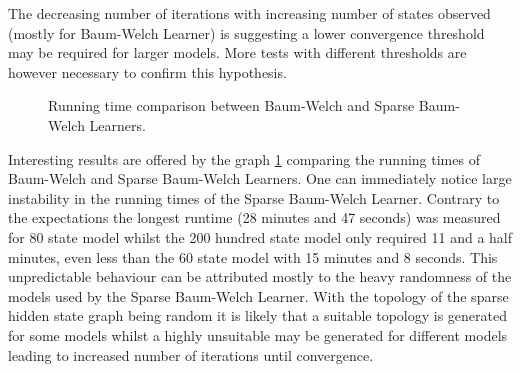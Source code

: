 The decreasing number of iterations with increasing number of states observed (mostly for Baum-Welch Learner) is suggesting a lower convergence threshold may be required for larger models. More tests with different thresholds are however necessary to confirm this hypothesis.

\begin{figure}
	\centering
	
	
	\caption{Running time comparison between Baum-Welch and Sparse Baum-Welch Learners.}
	\label{fig:bw_vs_sbw}
\end{figure}

Interesting results are offered by the graph \ref{fig:bw_vs_sbw} comparing the running times of Baum-Welch and Sparse Baum-Welch Learners. One can immediately notice large instability in the running times of the Sparse Baum-Welch Learner. Contrary to the expectations the longest runtime (28 minutes and 47 seconds) was measured for 80 state model whilst the 200 hundred state model only required 11 and a half minutes, even less than the 60 state model with 15 minutes and 8 seconds. This unpredictable behaviour can be attributed mostly to the heavy randomness of the models used by the Sparse Baum-Welch Learner. With the topology of the sparse hidden state graph being random it is likely that a suitable topology is generated for some models whilst a highly unsuitable may be generated for different models leading to increased number of iterations until convergence.

